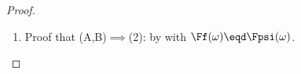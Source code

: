 \begin{proof}
\begin{enumerate}
  \item Proof that (A,B)$\implies$(2): by  with $\Ff(\omega)\eqd\Fpsi(\omega)$.

\end{enumerate}
\end{proof}
